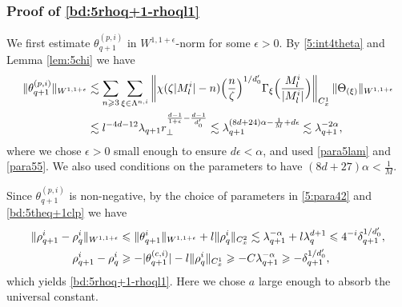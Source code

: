 \documentclass[UTF-8,reqno]{amsart}
\numberwithin{equation}{section}
\theoremstyle{definition}
\def\({{\Big(}}
\def\){{\Big)}}
\newcommand{\norm}[1]{\left\|#1\right\|}
\def\geq{\geqslant}
\def\leq{\leqslant}
\def\({{\Big(}}
\def\){{\Big)}}
\def\geq{\geqslant}
\def\leq{\leqslant}
\begin{document}
\subsubsection{Proof of   \eqref{bd:5rhoq+1-rhoql1}} 
 We first estimate $\theta_{q+1}^{(p,i)}$ in $W^{1,1+\epsilon}$-norm for some $\epsilon>0$. By  \eqref{5:int4theta}  and  Lemma \ref{lem:5chi} we have
\begin{align}
\|\theta_{q+1}^{(p,i)}\|_{W^{1,1+\epsilon}}&\lesssim\sum_{n\geq3}\sum_{\xi\in\Lambda^{n,i}}\norm{\chi(\zeta |M^i_l|-n)\(\frac{n}{\zeta }\)^{1/d_0'}\Gamma_{\xi}\(\frac{M^i_l}{|M^i_l|}\)}_ {C_{x}^1}\|\Theta_{ (\xi)} \|_{W^{1,1+\epsilon}}\notag\\ 
&\lesssim l^{-4d-12}\lambda_{q+1}r_\perp^{\frac{d-1}{1+\epsilon}-\frac{d-1}{d_0'}}
\lesssim\lambda_{q+1}^{(8d+24)\alpha-\frac1M+d\epsilon}\lesssim  \lambda_{q+1}^{-2\alpha},\label{bd:5thetaq+1w11}
\end{align}
where we chose $\epsilon>0$ small enough to ensure $d\epsilon<\alpha$, and used \eqref{para5lam} and  \eqref{para55}. We also used  conditions on the parameters to have $(8d+27)\alpha<\frac1M$. 

Since $\theta_{q+1}^{(p,i)}$ is non-negative,  by the choice of parameters in \eqref{5:para42}  and \eqref{bd:5theq+1clp}  we have
\begin{align}\|\rho^{i}_{q+1}-\rho^{i}_q\|_{W^{1,1+\epsilon}} 
&\leq\|\theta^{i}_{q+1}\|_{W^{1,1+\epsilon}} +l\|\rho_q^i\|_{C_{x}^2} \lesssim  \lambda_{q+1}^{-\alpha}+l\lambda_q^{d+1}\leq 4^{-i}\delta_{q+1}^{1/d_0'},\notag\\
     \rho^i_{q+1} -   \rho^i_q&\geq-|\theta_{q+1}^{(c,i)}|-l\|  \rho^i_{q}\|_{ C_{x}^1} \geq -C\lambda_{q+1}^{-\alpha}\geq -\delta_{q+1}^{1/d_0'},\notag
\end{align}
which yields \eqref{bd:5rhoq+1-rhoql1}.  Here we chose $a$ large enough to absorb the universal constant. 
\end{document}
